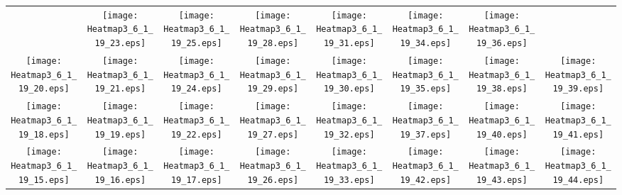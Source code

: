 \documentclass{standalone}
\begin{document}
\renewcommand{\arraystretch}{0}
\setlength{\tabcolsep}{0pt}
\begin{tabular}{ *8{c} }
 & \texttt{[image: Heatmap3\_6\_1\_19\_23.eps]} & \texttt{[image: Heatmap3\_6\_1\_19\_25.eps]} & \texttt{[image: Heatmap3\_6\_1\_19\_28.eps]} & \texttt{[image: Heatmap3\_6\_1\_19\_31.eps]} & \texttt{[image: Heatmap3\_6\_1\_19\_34.eps]} & \texttt{[image: Heatmap3\_6\_1\_19\_36.eps]} &  \\
\texttt{[image: Heatmap3\_6\_1\_19\_20.eps]} & \texttt{[image: Heatmap3\_6\_1\_19\_21.eps]} & \texttt{[image: Heatmap3\_6\_1\_19\_24.eps]} & \texttt{[image: Heatmap3\_6\_1\_19\_29.eps]} & \texttt{[image: Heatmap3\_6\_1\_19\_30.eps]} & \texttt{[image: Heatmap3\_6\_1\_19\_35.eps]} & \texttt{[image: Heatmap3\_6\_1\_19\_38.eps]} & \texttt{[image: Heatmap3\_6\_1\_19\_39.eps]} \\
\texttt{[image: Heatmap3\_6\_1\_19\_18.eps]} & \texttt{[image: Heatmap3\_6\_1\_19\_19.eps]} & \texttt{[image: Heatmap3\_6\_1\_19\_22.eps]} & \texttt{[image: Heatmap3\_6\_1\_19\_27.eps]} & \texttt{[image: Heatmap3\_6\_1\_19\_32.eps]} & \texttt{[image: Heatmap3\_6\_1\_19\_37.eps]} & \texttt{[image: Heatmap3\_6\_1\_19\_40.eps]} & \texttt{[image: Heatmap3\_6\_1\_19\_41.eps]} \\
\texttt{[image: Heatmap3\_6\_1\_19\_15.eps]} & \texttt{[image: Heatmap3\_6\_1\_19\_16.eps]} & \texttt{[image: Heatmap3\_6\_1\_19\_17.eps]} & \texttt{[image: Heatmap3\_6\_1\_19\_26.eps]} & \texttt{[image: Heatmap3\_6\_1\_19\_33.eps]} & \texttt{[image: Heatmap3\_6\_1\_19\_42.eps]} & \texttt{[image: Heatmap3\_6\_1\_19\_43.eps]} & \texttt{[image: Heatmap3\_6\_1\_19\_44.eps]} \\

\end{tabular}
\end{document}
